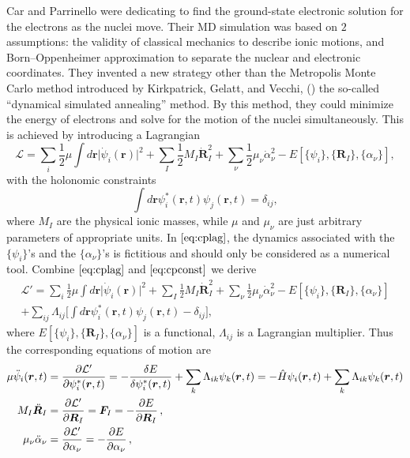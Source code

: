Car and Parrinello were dedicating to find the ground-state electronic
solution for the electrons as the nuclei move. Their MD simulation was
based on $2$ assumptions: the validity of classical mechanics to describe
ionic motions, and Born--Oppenheimer approximation to separate the
nuclear and electronic coordinates.
They invented a new strategy other than the Metropolis Monte Carlo method
introduced by Kirkpatrick, Gelatt, and Vecchi, (\cite{Kirkpatrick:1983zz})
the so-called ``dynamical simulated annealing'' method.
By this method, they could minimize the energy of electrons and solve
for the motion of the nuclei simultaneously. This is achieved by introducing
a Lagrangian
\begin{equation}\label{eq:cplag}
	\mathcal{L} = \sum_{i} \frac{ 1 }{ 2 } \mu \int d\bm{r} \lvert
	\dot{\psi}_i(\bm{r}) \rvert ^ 2 +
	\sum_{I} \frac{ 1 }{ 2 } M_I \dot{ \bm{R} }_I ^ 2 +
	\sum_{\nu} \frac{ 1 }{ 2 } \mu_{\nu}  \dot{ \alpha }_\nu ^ 2 -
	E[\{ \psi_i \}, \{ \bm{R}_I \}, \{ \alpha_\nu \}],
\end{equation}
with the holonomic constraints
\begin{equation}\label{eq:cpconst}
	\int d\bm{r} \psi_i ^ \ast (\bm{r}, t) \psi_j (\bm{r}, t) = \delta_{ij},
\end{equation}
where $M_I$ are the physical ionic masses, while $\mu$ and $\mu_{\nu}$
are just arbitrary parameters of appropriate units.
In $\eqref{eq:cplag}$,
the dynamics associated with the $\{ \psi_i \}$'s and
the $\{ \alpha_\nu \}$'s is fictitious and should only be considered
as a numerical tool.
Combine
$\eqref{eq:cplag}$ and $\eqref{eq:cpconst}$ we derive
\begin{multline}
	\mathcal{L}' =
	\sum_{i} \frac{ 1 }{ 2 } \mu \int d\bm{r} \lvert
	\dot{\psi}_i(\bm{r}) \rvert ^ 2 +
	\sum_{I} \frac{ 1 }{ 2 } M_I \dot{ \bm{R} }_I ^ 2 +
	\sum_{\nu} \frac{ 1 }{ 2 } \mu_{\nu}  \dot{ \alpha }_\nu ^ 2 -
	E[\{ \psi_i \}, \{ \bm{R}_I \}, \{ \alpha_\nu \}]\\
	+ \sum_{ij} \Lambda_{ij} \bigg[
		\int d\bm{r} \psi_i ^ \ast (\bm{r}, t) \psi_j (\bm{r}, t) - \delta_{ij}
		\bigg],
\end{multline}
where $E[\{ \psi_i \}, \{ \bm{R}_I \}, \{ \alpha_\nu \}]$ is a functional,
$\Lambda_{ij}$ is a Lagrangian multiplier.
Thus the corresponding equations of motion are
\begin{align}
	\mu \ddot{\psi}_i (\bm{r}, t) & =
	\frac{ \partial \mathcal{L}' }{ \partial \psi_i^\ast (\bm{r}, t)} = -
	\frac{ \delta E}{ \delta \psi_i^\ast (\bm{r}, t)} + \sum_{k}
	\Lambda_{ik} \psi_k (\bm{r}, t) =
	- \hat{H} \psi_i(\bm{r}, t) + \sum_{k}
	\Lambda_{ik} \psi_k (\bm{r}, t)                        \\
	M_I \ddot{\bm{R}}_I           & =
	\frac{ \partial \mathcal{L}' }{ \partial \bm{R}_I } =
	\bm{F}_{I} =
	- \frac{ \partial E }{ \partial \bm{R}_I } \thinspace, \\
	\mu_{\nu} \ddot{\alpha}_{\nu} & =
	\frac{ \partial \mathcal{L}' }{ \partial \alpha_{\nu} } =
	- \frac{ \partial E }{ \partial \alpha_{\nu} } \thinspace,
\end{align}
